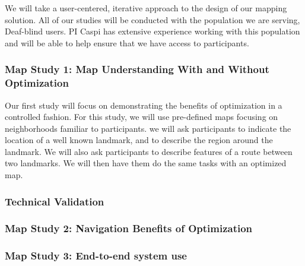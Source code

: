 We will take a user-centered, iterative approach to the design of our mapping solution. All of our studies will be conducted with the population we are serving, Deaf-blind users. PI Caspi has extensive experience working with this population  and will be able to help ensure that we have access to participants. 

\subsubsection{Map Study 1: Map Understanding With and Without Optimization}
\label{sec:lab-tests}
Our first study will focus on demonstrating the benefits of optimization in a controlled fashion. For this study, we will use pre-defined maps focusing on neighborhoods familiar to participants. we will ask participants to indicate the location of a well known landmark, and to describe the region around the landmark. We will also ask participants to describe features of a route between two landmarks. We will then have them do the same tasks with an optimized map. 

\subsubsection{Technical Validation}

\subsubsection{Map Study 2: Navigation Benefits of Optimization}
\label{sec:field-map}

\subsubsection{Map Study 3: End-to-end system use}
\label{sec:field-web}
